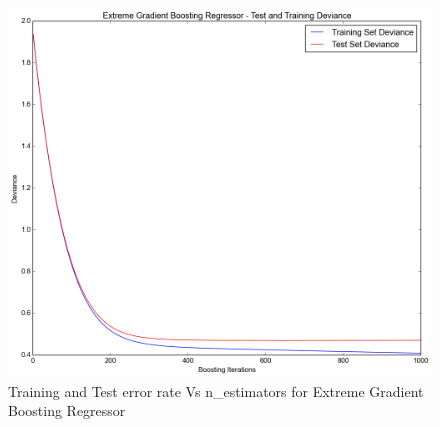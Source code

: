 \documentclass[twoside,12pt]{article}
\begin{document}
\begin{itemize}
\begin{figure}[!htbp]
	\includegraphics[scale=.43]{DataVisualization/xgbr_ed_n.png} 
	\caption{Training and Test error rate Vs n\_estimators for Extreme Gradient Boosting Regressor}
	\label{n_est_xgbr}
\end{figure}

\FloatBarrier

\end{itemize}
\end{document}
